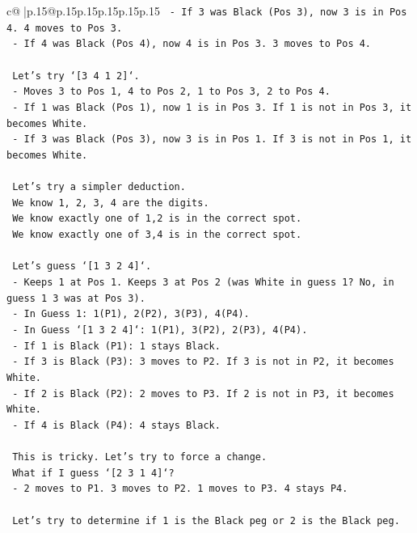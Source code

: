 \documentclass{article}
\begin{document}
{\begin{supertabular}{c@{$\;$}|p{.15\linewidth}@{}p{.15\linewidth}p{.15\linewidth}p{.15\linewidth}p{.15\linewidth}p{.15\linewidth}}
{{{\texttt{    {-} If 3 was Black (Pos 3), now 3 is in Pos 4. 4 moves to Pos 3.} \\
\texttt{    {-} If 4 was Black (Pos 4), now 4 is in Pos 3. 3 moves to Pos 4.} \\
\\ 
\texttt{    Let's try `{[}3 4 1 2{]}`.} \\
\texttt{    {-} Moves 3 to Pos 1, 4 to Pos 2, 1 to Pos 3, 2 to Pos 4.} \\
\texttt{    {-} If 1 was Black (Pos 1), now 1 is in Pos 3. If 1 is not in Pos 3, it becomes White.} \\
\texttt{    {-} If 3 was Black (Pos 3), now 3 is in Pos 1. If 3 is not in Pos 1, it becomes White.} \\
\\ 
\texttt{    Let's try a simpler deduction.} \\
\texttt{    We know 1, 2, 3, 4 are the digits.} \\
\texttt{    We know exactly one of 1,2 is in the correct spot.} \\
\texttt{    We know exactly one of 3,4 is in the correct spot.} \\
\\ 
\texttt{    Let's guess `{[}1 3 2 4{]}`.} \\
\texttt{    {-} Keeps 1 at Pos 1. Keeps 3 at Pos 2 (was White in guess 1? No, in guess 1 3 was at Pos 3).} \\
\texttt{    {-} In Guess 1: 1(P1), 2(P2), 3(P3), 4(P4).} \\
\texttt{    {-} In Guess `{[}1 3 2 4{]}`: 1(P1), 3(P2), 2(P3), 4(P4).} \\
\texttt{    {-} If 1 is Black (P1): 1 stays Black.} \\
\texttt{    {-} If 3 is Black (P3): 3 moves to P2. If 3 is not in P2, it becomes White.} \\
\texttt{    {-} If 2 is Black (P2): 2 moves to P3. If 2 is not in P3, it becomes White.} \\
\texttt{    {-} If 4 is Black (P4): 4 stays Black.} \\
\\ 
\texttt{    This is tricky. Let's try to force a change.} \\
\texttt{    What if I guess `{[}2 3 1 4{]}`?} \\
\texttt{    {-} 2 moves to P1. 3 moves to P2. 1 moves to P3. 4 stays P4.} \\
\\ 
\texttt{    Let's try to determine if 1 is the Black peg or 2 is the Black peg.} \\
}}}
\end{supertabular}}
\end{document}
